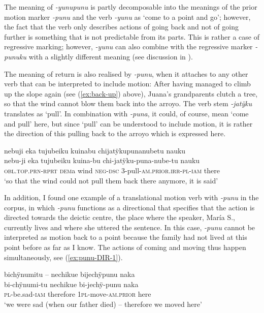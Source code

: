The meaning of \textit{-yunupunu} is partly decomposable into the meanings of the prior motion marker \textit{-punu} and the verb \textit{-yunu} as ‘come to a point and go’; however, the fact that the verb only describes actions of going back and not of going further is something that is not predictable from its parts. This is rather a case of regressive marking; however, \textit{-yunu} can also combine with the regressive marker \textit{-punuku} with a slightly different meaning (see discussion in ).

The meaning of return is also realised by \textit{-punu}, when it attaches to any other verb that can be interpreted to include motion: After having managed to climb up the slope again (see (\ref{ex:back-up}) above), Juana’s grandparents clutch a tree, so that the wind cannot blow them back into the arroyo. The verb stem \textit{-jatÿku} translates as ‘pull’. In combination with \textit{-puna}, it could, of course, mean ‘come and pull’ here, but since ‘pull’ can be understood to include motion, it is rather the direction of this pulling back to the arroyo which is expressed here.

\ea\label{ex:punu-DIR-2}
\begingl 
\glpreamble nebuji eka tujubeiku kuinabu chijatÿkupunanubetu nauku\\
\gla nebu-ji eka tujubeiku kuina-bu chi-jatÿku-puna-nube-tu nauku\\ 
\textsc{obl.top.prn}-\textsc{rprt} \textsc{dem}a wind \textsc{neg}-\textsc{dsc} 3-pull-\textsc{am.prior.irr}-\textsc{pl}-\textsc{iam} there\\ 
\glft ‘so that the wind could not pull them back there anymore, it is said’
\trailingcitation{[jxx-p151016l-2]}
\xe

In addition, I found one example of a translational motion verb with \textit{-punu} in the corpus, in which \textit{-punu} functions as a directional that specifies that the action is directed towards the deictic centre, the place where the speaker, María S., currently lives and where she uttered the sentence. In this case, \textit{-punu} cannot be interpreted as motion back to a point because the family had not lived at this point before as far as I know. The actions of coming and moving thus happen simultaneously, see (\ref{ex:punu-DIR-1}).

\ea\label{ex:punu-DIR-1}
\begingl 
\glpreamble bichÿnumitu – nechikue bijechÿpunu naka\\
\gla bi-chÿnumi-tu nechikue bi-jechÿ-punu naka\\ 
\textsc{pl}-be.sad-\textsc{iam} therefore 1\textsc{pl}-move-\textsc{am.prior} here\\ 
\glft ‘we were sad (when our father died) – therefore we moved here’
\trailingcitation{[rxx-e120511l.170-171]}
\xe


